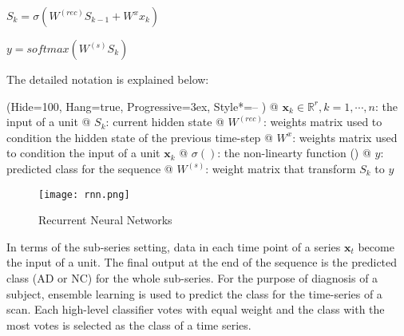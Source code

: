 \begin{center}
$S_k = \sigma(W^{(rec)}S_{k-1} + W^{x}x_k )$
\end{center} 
\begin{center}
$y = softmax(W^{(s)}S_k)$
\end{center}

The detailed notation is explained below:
\begin{easylist}
\ListProperties(Hide=100, Hang=true, Progressive=3ex, Style*=-- )
@ $ \textbf{x}_k \in  \mathbb{R}^{r}, k=1, \cdots , n$: the input of a unit
@ $S_k $: current hidden state
@ $W^{(rec)}$: weights matrix used to condition the hidden state of the previous time-step 
@ $W^{x}$: weights matrix used to condition the input of a unit $ \textbf{x}_k$
@ $\sigma()$: the non-linearty function ()
@ $y$: predicted class for the sequence
@ $W^{(s)}$: weight matrix that transform $S_k$ to $y$
\end{easylist}

\begin{figure}[H!]
    \centering
    \texttt{[image: rnn.png]}
    \caption{Recurrent Neural Networks}
    \label{fig:awesome_image}
\end{figure}

In terms of the sub-series setting, data in each time point of a series $\textbf{x}_t$ become the input of a unit. The final output at the end of the sequence is the predicted class (AD or NC) for the whole sub-series. For the purpose of diagnosis of a subject, ensemble learning is used to predict the class for the time-series of a scan. Each high-level classifier votes with equal weight and the class with the most votes is selected as the class of a time series.
